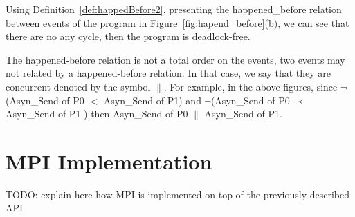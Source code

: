 \documentclass[a4paper,11pt]{article}
\begin{document}
Using Definition~\ref{def:happedBefore2}, presenting the happened\_before relation between events of the program in Figure~\ref{fig:hapend_before}(b), we can see that there are no any cycle, then the program is deadlock-free.

The happened-before relation is not a total order on the events, two events may not related by a happened-before relation. In that case, we say that they are concurrent denoted by the symbol $\parallel$. For example, in the above figures, since $\neg$(Asyn\_Send of P0 $<$ Asyn\_Send of P1) and $\neg$(Asyn\_Send of P0 $ \prec$  Asyn\_Send of P1 ) then Asyn\_Send of P0 $\parallel$ Asyn\_Send of P1.  

\section{MPI Implementation}
TODO: explain here how MPI is implemented on top of the previously described API

%
%
	
\end{document}
